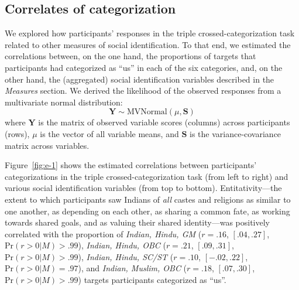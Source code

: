 \documentclass[12pt, a4paper]{article}
\begin{document}
\subsection{Correlates of categorization}

We explored how participants' responses in the triple crossed-categorization task related to other measures of social identification. To that end, we estimated the correlations between, on the one hand, the proportions of targets that participants had categorized as ``us'' in each of the six categories, and, on the other hand, the (aggregated) social identification variables described in the \emph{Measures} section. We derived the likelihood of the observed responses from a multivariate normal distribution: $$ \textbf{Y} \sim \text{MVNormal} (\mu , \textbf{S} ) $$ where $\textbf{Y}$ is the matrix of observed variable scores (columns) across participants (rows), $\mu$ is the vector of all variable means, and $\textbf{S}$ is the variance-covariance matrix across variables.

Figure~\ref{fig:e-1} shows the estimated correlations between participants' categorizations in the triple crossed-categorization task (from left to right) and various social identification variables (from top to bottom). Entitativity---the extent to which participants saw Indians of \emph{all} castes and religions as similar to one another, as depending on each other, as sharing a common fate, as working towards shared goals, and as valuing their shared identity---was positively correlated with the proportion of \emph{Indian, Hindu, GM} ($r = .16$, $[.04, .27]$, $\text{Pr} (r > 0|M) > .99$), \emph{Indian, Hindu, OBC} ($r = .21$, $[.09, .31]$, $\text{Pr} (r > 0| M) > .99$), \emph{Indian, Hindu, SC/ST} ($r = .10$, $[-.02, .22]$, $\text{Pr} (r > 0| M) = .97$), and \emph{Indian, Muslim, OBC} ($r = .18$, $[.07, .30]$, $\text{Pr} (r > 0| M) > .99$) targets participants categorized as ``us''.
\end{document}
